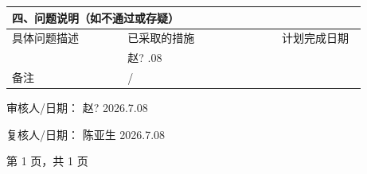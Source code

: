 \documentclass[UTF8,10pt,a4paper,fontset=fandol]{ctexart}
\newcommand{\fieldvalue}[1]{#1}
\newcommand{\handwritten}[1]{#1}
\begin{document}
\vspace{0.5em}

\noindent
\begin{tabular}{|p{0.30\linewidth}|p{0.40\linewidth}|p{0.22\linewidth}|}
\hline
\multicolumn{3}{l|}{四、问题说明（如不通过或存疑）}\\
\hline
具体问题描述 & 已采取的措施 & 计划完成日期\\
\hline
& 
\fieldvalue{\handwritten{赵? \quad 2026.07.08}} &
\\[3em]
\hline
备注 &
\fieldvalue{\handwritten{/}} &
\\[1.5em]
\hline
\end{tabular}

\vspace{0.6em}

审核人/日期：
\fieldvalue{\handwritten{赵?}}
\quad
\fieldvalue{\handwritten{2026.7.08}}

\hfill

复核人/日期：
\fieldvalue{\handwritten{陈亚生}}
\quad
\fieldvalue{\handwritten{2026.7.08}}

\vfill

\begin{center}
第 1 页，共 1 页
\end{center}
\end{document}
